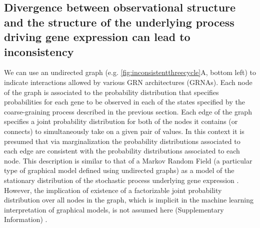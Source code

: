 \subsection{Divergence between observational structure and the structure of the underlying process driving gene expression can lead to inconsistency}
We can use an undirected graph (e.g. \ref{fig:inconsistentthreecycle}A, bottom left) to indicate interactions allowed by various GRN architectures (GRNAs). Each node of the graph is associated to the probability distribution that specifies probabilities for each gene to be observed in each of the states specified by the coarse-graining process described in the previous section. Each edge of the graph specifies a joint probability distribution for both of the nodes it contains (or connects) to simultaneously take on a given pair of values. In this context it is presumed that via marginalization the probability distributions associated to each edge are consistent with the probability distributions associated to each node. This description is similar to that of a Markov Random Field (a particular type of graphical model defined using undirected graphs) as a model of the stationary distribution of the stochastic process underlying gene expression \cite{Lauritzen1996,Chen2013a}. However, the implication of existence of a factorizable joint probability distribution over all nodes in the graph, which is implicit in the machine learning interpretation of graphical models, is not assumed here (Supplementary Information) \cite{Barber2012,Bishop2007,Murphy2012,Koller2009}.

